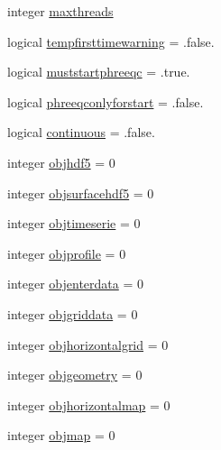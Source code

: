 \begin{DoxyCompactItemize}
integer \mbox{\hyperlink{structmodulewaterproperties_1_1t__waterproperties_aa67acf3024e9f335316558033ccfeadc}{maxthreads}}
\item 
logical \mbox{\hyperlink{structmodulewaterproperties_1_1t__waterproperties_a53a488544202cbcc2c1fe288aa3fbe79}{tempfirsttimewarning}} = .false.
\item 
logical \mbox{\hyperlink{structmodulewaterproperties_1_1t__waterproperties_aecae13314d44a88d4d6f019140c3a410}{muststartphreeqc}} = .true.
\item 
logical \mbox{\hyperlink{structmodulewaterproperties_1_1t__waterproperties_a79bd9405c1a680bc0e41d2135f9e6a79}{phreeqconlyforstart}} = .false.
\item 
logical \mbox{\hyperlink{structmodulewaterproperties_1_1t__waterproperties_abc70ad08582eb4b2c04394bd50e75cba}{continuous}} = .false.
\item 
integer \mbox{\hyperlink{structmodulewaterproperties_1_1t__waterproperties_a92618e488c2f24f7bed92f65c061690c}{objhdf5}} = 0
\item 
integer \mbox{\hyperlink{structmodulewaterproperties_1_1t__waterproperties_a4726591e12168428182866c1abcdd0aa}{objsurfacehdf5}} = 0
\item 
integer \mbox{\hyperlink{structmodulewaterproperties_1_1t__waterproperties_a7946c140e1e4d674203b5a97c95b0b85}{objtimeserie}} = 0
\item 
integer \mbox{\hyperlink{structmodulewaterproperties_1_1t__waterproperties_ab184e3f5b74380f097601da822586be9}{objprofile}} = 0
\item 
integer \mbox{\hyperlink{structmodulewaterproperties_1_1t__waterproperties_ab6bfd2f3cc6f26d36999e748ebd7cac1}{objenterdata}} = 0
\item 
integer \mbox{\hyperlink{structmodulewaterproperties_1_1t__waterproperties_a74996d4560dbf78881891305d5f02a4e}{objgriddata}} = 0
\item 
integer \mbox{\hyperlink{structmodulewaterproperties_1_1t__waterproperties_a3823dadd67e3ac4c0b84ff41dbefad99}{objhorizontalgrid}} = 0
\item 
integer \mbox{\hyperlink{structmodulewaterproperties_1_1t__waterproperties_a55cbb1eebb85cac62835e08b27f32be0}{objgeometry}} = 0
\item 
integer \mbox{\hyperlink{structmodulewaterproperties_1_1t__waterproperties_a958470370e3fe0a880ffba3271d734e0}{objhorizontalmap}} = 0
\item 
integer \mbox{\hyperlink{structmodulewaterproperties_1_1t__waterproperties_ac8f1d1a7808ab2859d7326faca598ba3}{objmap}} = 0

\end{DoxyCompactItemize}
